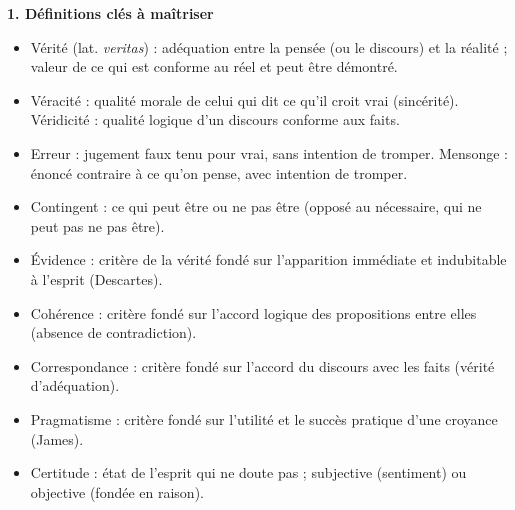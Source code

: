 \documentclass[11pt]{article}
\newcommand{\cle}[1]{{\popxbold\color{popdark}#1}}
\begin{document}
\begin{bilan}
\textbf{1. Définitions clés à maîtriser}
\begin{itemize}
  \item \cle{Vérité} (lat. \emph{veritas}) : adéquation entre la pensée (ou le discours) et la réalité ; valeur de ce qui est conforme au réel et peut être démontré.
  \item \cle{Véracité} : qualité morale de celui qui dit ce qu'il croit vrai (sincérité). \cle{Véridicité} : qualité logique d'un discours conforme aux faits.
  \item \cle{Erreur} : jugement faux tenu pour vrai, sans intention de tromper. \cle{Mensonge} : énoncé contraire à ce qu'on pense, avec intention de tromper.
  \item \cle{Contingent} : ce qui peut être ou ne pas être (opposé au \cle{nécessaire}, qui ne peut pas ne pas être).
  \item \cle{Évidence} : critère de la vérité fondé sur l'apparition immédiate et indubitable à l'esprit (Descartes).
  \item \cle{Cohérence} : critère fondé sur l'accord logique des propositions entre elles (absence de contradiction).
  \item \cle{Correspondance} : critère fondé sur l'accord du discours avec les faits (vérité d'adéquation).
  \item \cle{Pragmatisme} : critère fondé sur l'utilité et le succès pratique d'une croyance (James).
  \item \cle{Certitude} : état de l'esprit qui ne doute pas ; subjective (sentiment) ou objective (fondée en raison).
\end{itemize}


\end{bilan}
\end{document}

